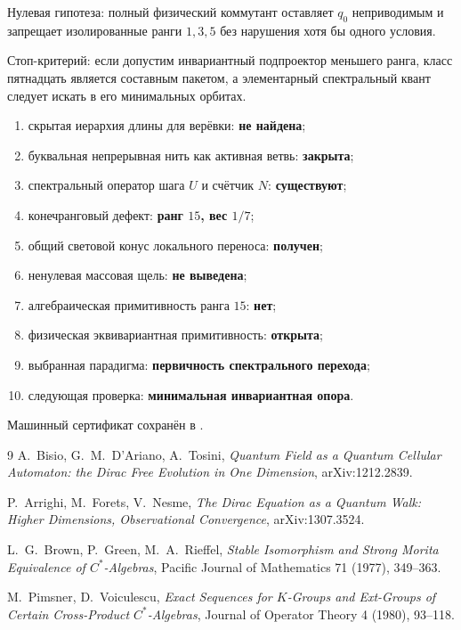 Нулевая гипотеза: полный физический коммутант оставляет $q_0$ неприводимым
и запрещает изолированные ранги $1,3,5$ без нарушения хотя бы одного
условия.

Стоп-критерий: если допустим инвариантный подпроектор меньшего ранга,
класс пятнадцать является составным пакетом, а элементарный спектральный
квант следует искать в его минимальных орбитах.

\begin{protocol}
\begin{enumerate}
 \item скрытая иерархия длины для верёвки: \textbf{не найдена};
 \item буквальная непрерывная нить как активная ветвь: \textbf{закрыта};
 \item спектральный оператор шага $U$ и счётчик $N$: \textbf{существуют};
 \item конечранговый дефект: \textbf{ранг $15$, вес $1/7$};
 \item общий световой конус локального переноса: \textbf{получен};
 \item ненулевая массовая щель: \textbf{не выведена};
 \item алгебраическая примитивность ранга $15$: \textbf{нет};
 \item физическая эквивариантная примитивность: \textbf{открыта};
 \item выбранная парадигма: \textbf{первичность спектрального перехода};
 \item следующая проверка: \textbf{минимальная инвариантная опора}.
\end{enumerate}
\end{protocol}

Машинный сертификат сохранён в
.

\begin{thebibliography}{9}
A.~Bisio, G.~M.~D'Ariano, A.~Tosini,
\emph{Quantum Field as a Quantum Cellular Automaton: the Dirac Free
Evolution in One Dimension}, arXiv:1212.2839.

P.~Arrighi, M.~Forets, V.~Nesme,
\emph{The Dirac Equation as a Quantum Walk: Higher Dimensions,
Observational Convergence}, arXiv:1307.3524.

L.~G.~Brown, P.~Green, M.~A.~Rieffel,
\emph{Stable Isomorphism and Strong Morita Equivalence of
$C^*$-Algebras}, Pacific Journal of Mathematics 71 (1977), 349--363.

M.~Pimsner, D.~Voiculescu,
\emph{Exact Sequences for $K$-Groups and Ext-Groups of Certain
Cross-Product $C^*$-Algebras}, Journal of Operator Theory 4 (1980),
93--118.
\end{thebibliography}